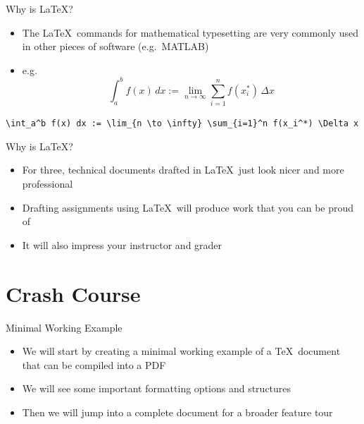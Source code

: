 \documentclass{beamer} %
\begin{document}
\begin{frame}{Why is \LaTeX?}

\begin{itemize}
	\item The \LaTeX\ commands for mathematical typesetting are very commonly used in other pieces of software (e.g.~MATLAB)
	\item e.g. $$\int_a^b f(x) \, dx := \lim_{n \to \infty} \sum_{i=1}^n f(x_i^*) \, \Delta x$$
\end{itemize}

\scriptsize

\texttt{\textbackslash int\_a\^{}b f(x) dx := \textbackslash lim\_\{n \textbackslash to \textbackslash infty\} \textbackslash sum\_\{i=1\}\^{}n f(x\_i\^{}*) \textbackslash Delta x}

\end{frame}

\begin{frame}{Why is \LaTeX?}

\begin{itemize}
	\item For three, technical documents drafted in \LaTeX\ just look nicer and more professional
	\item Drafting assignments using \LaTeX\ will produce work that you can be proud of
	\item It will also impress your instructor and grader
\end{itemize}

\end{frame}

\section{Crash Course}

\begin{frame}{Minimal Working Example}

\begin{itemize}
	\item We will start by creating a minimal working example of a \TeX\ document that can be compiled into a PDF
	\item We will see some important formatting options and structures
	\item Then we will jump into a complete document for a broader feature tour
\end{itemize}

\end{frame}
\end{document}
